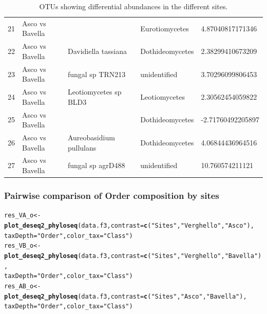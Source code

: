 \documentclass[12pt]{article}\usepackage[]{graphicx}\usepackage[]{color}
\makeatletter
\newcommand{\hlstr}[1]{\textcolor[rgb]{0.192,0.494,0.8}{#1}}%
\newcommand{\hlstd}[1]{\textcolor[rgb]{0.345,0.345,0.345}{#1}}%
\newcommand{\hlkwb}[1]{\textcolor[rgb]{0.69,0.353,0.396}{#1}}%
\newcommand{\hlkwc}[1]{\textcolor[rgb]{0.333,0.667,0.333}{#1}}%
\newcommand{\hlkwd}[1]{\textcolor[rgb]{0.737,0.353,0.396}{\textbf{#1}}}%
\newenvironment{kframe}{%
 \def\at@end@of@kframe{}%
 \ifinner\ifhmode%
  \def\at@end@of@kframe{\end{minipage}}%
  \begin{minipage}{\columnwidth}%
 \fi\fi%
 \def\FrameCommand##1{\hskip\@totalleftmargin \hskip-\fboxsep
 \colorbox{shadecolor}{##1}\hskip-\fboxsep
     \hskip-\linewidth \hskip-\@totalleftmargin \hskip\columnwidth}%
 \MakeFramed {\advance\hsize-\width
   \@totalleftmargin\z@ \linewidth\hsize
   \@setminipage}}%
 {\par\unskip\endMakeFramed%
 \at@end@of@kframe}
\newenvironment{knitrout}{}{} %
\numberwithin{figure}{section}
\makeatother
\begin{document}
\begin{table}[ht]
\begin{tabular}{lllll}
  21 & Asco vs Bavella &  & Eurotiomycetes & 4.87040817171346 \\ 
  22 & Asco vs Bavella & Davidiella tassiana & Dothideomycetes & 2.38299410673209 \\ 
  23 & Asco vs Bavella & fungal sp TRN213 & unidentified & 3.70296099806453 \\ 
  24 & Asco vs Bavella & Leotiomycetes sp BLD3 & Leotiomycetes & 2.30562454059822 \\ 
  25 & Asco vs Bavella &  & Dothideomycetes & -2.71760492205897 \\ 
  26 & Asco vs Bavella & Aureobasidium pullulans & Dothideomycetes & 4.06844436964516 \\ 
  27 & Asco vs Bavella & fungal sp agrD488 & unidentified & 10.760574211121 \\ 
   \hline
\end{tabular}
\endgroup
\caption{OTUs showing differential abundances in the different sites.} 
\end{table}


    \subsubsection{Pairwise comparison of Order composition by sites}

\begin{knitrout}\small
{}\color{fgcolor}\begin{kframe}
\begin{alltt}
\hlstd{res_VA_o} \hlkwb{<-} \hlkwd{plot_deseq2_phyloseq}\hlstd{(data.f3,} \hlkwc{contrast} \hlstd{=} \hlkwd{c}\hlstd{(}\hlstr{"Sites"}\hlstd{,} \hlstr{"Verghello"}\hlstd{,} \hlstr{"Asco"}\hlstd{),}
                               \hlkwc{taxDepth} \hlstd{=} \hlstr{"Order"}\hlstd{,} \hlkwc{color_tax} \hlstd{=} \hlstr{"Class"}\hlstd{)}
\hlstd{res_VB_o} \hlkwb{<-} \hlkwd{plot_deseq2_phyloseq}\hlstd{(data.f3,} \hlkwc{contrast} \hlstd{=} \hlkwd{c}\hlstd{(}\hlstr{"Sites"}\hlstd{,} \hlstr{"Verghello"}\hlstd{,} \hlstr{"Bavella"}\hlstd{),}
                               \hlkwc{taxDepth} \hlstd{=} \hlstr{"Order"}\hlstd{,} \hlkwc{color_tax} \hlstd{=} \hlstr{"Class"}\hlstd{)}
\hlstd{res_AB_o} \hlkwb{<-} \hlkwd{plot_deseq2_phyloseq}\hlstd{(data.f3,} \hlkwc{contrast} \hlstd{=} \hlkwd{c}\hlstd{(}\hlstr{"Sites"}\hlstd{,} \hlstr{"Asco"}\hlstd{,} \hlstr{"Bavella"}\hlstd{),}
                               \hlkwc{taxDepth} \hlstd{=} \hlstr{"Order"}\hlstd{,} \hlkwc{color_tax} \hlstd{=} \hlstr{"Class"}\hlstd{)}
\end{alltt}
\end{kframe}
\end{knitrout}
\end{document}
